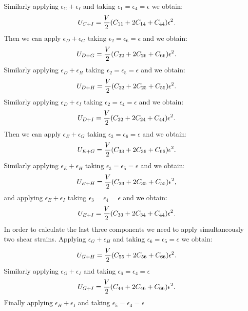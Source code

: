 \documentclass[12pt,a4paper]{article}
\begin{document}
Similarly applying $\epsilon_C + \epsilon_I$ and taking
$\epsilon_1=\epsilon_4=\epsilon$ we obtain:
\begin{equation}
U_{C+I}= {V \over 2} (C_{11}+2 C_{14} + C_{44}) \epsilon^2.
\end{equation}
Then we can apply $\epsilon_D + \epsilon_G$ taking
$\epsilon_2=\epsilon_6=\epsilon$ and we obtain:
\begin{equation}
U_{D+G}= {V \over 2} (C_{22}+2 C_{26} + C_{66}) \epsilon^2.
\end{equation}
Similarly applying $\epsilon_D + \epsilon_H$ taking
$\epsilon_2=\epsilon_5=\epsilon$ and we obtain:
\begin{equation}
U_{D+H}= {V \over 2} (C_{22}+2 C_{25} + C_{55}) \epsilon^2.
\end{equation}
Similarly applying $\epsilon_D + \epsilon_I$ taking
$\epsilon_2=\epsilon_4=\epsilon$ and we obtain:
\begin{equation}
U_{D+I}= {V \over 2} (C_{22}+2 C_{24} + C_{44}) \epsilon^2.
\end{equation}
Then we can apply $\epsilon_E + \epsilon_G$ taking
$\epsilon_3=\epsilon_6=\epsilon$ and we obtain:
\begin{equation}
U_{E+G}= {V \over 2} (C_{33}+2 C_{36} + C_{66}) \epsilon^2.
\end{equation}
Similarly applying $\epsilon_E + \epsilon_H$ taking
$\epsilon_3=\epsilon_5=\epsilon$ and we obtain:
\begin{equation}
U_{E+H}= {V \over 2} (C_{33}+2 C_{35} + C_{55}) \epsilon^2,
\end{equation}
and applying $\epsilon_E + \epsilon_I$ taking
$\epsilon_3=\epsilon_4=\epsilon$ and we obtain:
\begin{equation}
U_{E+I}= {V \over 2} (C_{33}+2 C_{34} + C_{44}) \epsilon^2.
\end{equation}
In order to calculate the last three components we need to apply
simultaneously two shear strains. Applying $\epsilon_G + \epsilon_H$ 
and taking $\epsilon_6=\epsilon_5=\epsilon$ we obtain:
\begin{equation}
U_{G+H}= {V \over 2} (C_{55}+2 C_{56} + C_{66}) \epsilon^2.
\end{equation}
Similarly applying $\epsilon_G + \epsilon_I$
and taking $\epsilon_6=\epsilon_4=\epsilon$
\begin{equation}
U_{G+I}= {V \over 2} (C_{44}+2 C_{46} + C_{66}) \epsilon^2.
\end{equation}
Finally applying $\epsilon_H + \epsilon_I$
and taking $\epsilon_5=\epsilon_4=\epsilon$
\end{document}

